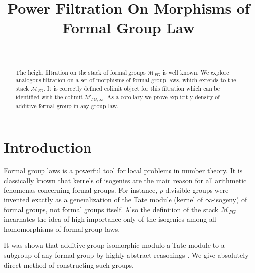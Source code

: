 \documentclass[
11pt,%
tightenlines,%
twoside,%
onecolumn,%
nofloats,%
nobibnotes,%
nofootinbib,%
superscriptaddress,%
noshowpacs,%
centertags]%
{revtex4}
\begin{document}

\title{Power Filtration On Morphisms of Formal Group Law}

\author{~}




\begin{abstract}
The height filtration on the stack of formal groups $\mathcal{M}_{FG}$ is well known. We explore analogous filtration on a set of morphisms of formal group laws, which extends to the stack $\mathcal{M}_{FG}$. It is correctly defined colimit object for this filtration which can be identified with the colimit $\mathcal{M}_{FG,\infty}$.  As a corollary we prove explicitly density of additive formal group in any group law.
\end{abstract}

\maketitle



\section{Introduction}
\label{intro}

Formal group laws is a powerful tool for local problems in number theory. It is classically known that kernels of isogenies are the main reason for all arithmetic fenomenas concerning formal groups. For instance, $p$-divisible groups were invented exactly as a generalization of the Tate module (kernel of $\infty$-isogeny) of formal groups, not formal groups itself. Also the definition of the stack $\mathcal{M}_{FG}$ \cite{Smith} incarnates the idea of high importance only of the isogenies among all homomorphisms of formal group laws.

It was shown that additive group isomorphic modulo a Tate module to a subgroup of any formal group by highly abstract reasonings \cite{Smith}. We give absolutely direct method of constructing such groups.
\end{document}
